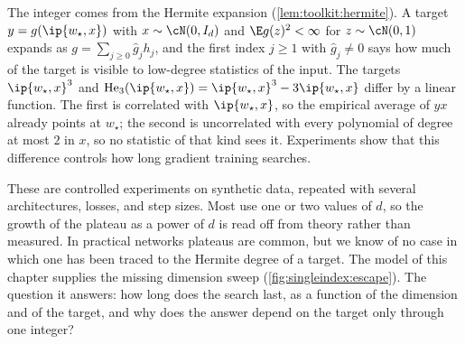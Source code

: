 \begin{refsection}
The integer comes from the Hermite expansion (\cref{lem:toolkit:hermite}). A target $y=g(\ip{w_\star,x})$ with $x\sim\cN(0,I_d)$ and $\E g(z)^2<\infty$ for $z\sim\cN(0,1)$ expands as $g=\sum_{j\ge0}\hat g_jh_j$, and the first index $j\ge1$ with $\hat g_j\ne0$ says how much of the target is visible to low-degree statistics of the input. The targets $\ip{w_\star,x}^3$ and $\He_3(\ip{w_\star,x})=\ip{w_\star,x}^3-3\ip{w_\star,x}$ differ by a linear function. The first is correlated with $\ip{w_\star,x}$, so the empirical average of $yx$ already points at $w_\star$; the second is uncorrelated with every polynomial of degree at most $2$ in $x$, so no statistic of that kind sees it. Experiments show that this difference controls how long gradient training searches.


These are controlled experiments on synthetic data, repeated with several architectures, losses, and step sizes. Most use one or two values of $d$, so the growth of the plateau as a power of $d$ is read off from theory rather than measured. In practical networks plateaus are common, but we know of no case in which one has been traced to the Hermite degree of a target. The model of this chapter supplies the missing dimension sweep (\cref{fig:singleindex:escape}). The question it answers: how long does the search last, as a function of the dimension and of the target, and why does the answer depend on the target only through one integer?


\end{refsection}

